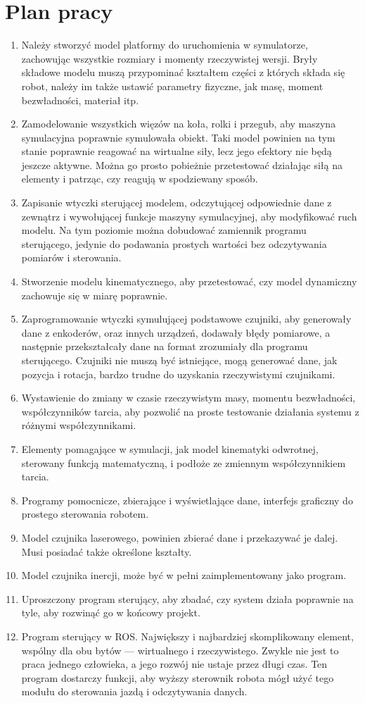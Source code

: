 \section{Plan pracy}
	\begin{enumerate}
	\item Należy stworzyć model platformy do uruchomienia w symulatorze, zachowując wszystkie rozmiary i momenty rzeczywistej wersji.
	Bryły składowe modelu muszą przypominać kształtem części z których składa się robot, należy im także ustawić parametry fizyczne, jak masę, moment bezwładności, materiał itp.
	\item Zamodelowanie wszystkich więzów na koła, rolki i przegub, aby maszyna symulacyjna poprawnie symulowała obiekt.
	Taki model powinien na tym stanie poprawnie reagować na wirtualne siły, lecz jego efektory nie będą jeszcze aktywne.
	Można go prosto pobieżnie przetestować działając siłą na elementy i patrząc, czy reagują w spodziewany sposób.
	\item Zapisanie wtyczki sterującej modelem, odczytującej odpowiednie dane z zewnątrz i wywołującej funkcje maszyny symulacyjnej, aby modyfikować ruch modelu.
	Na tym poziomie można dobudować zamiennik programu sterującego, jedynie do podawania prostych wartości bez odczytywania pomiarów i sterowania.
	\item Stworzenie modelu kinematycznego, aby przetestować, czy model dynamiczny zachowuje się w miarę poprawnie.
	\item Zaprogramowanie wtyczki symulującej podstawowe czujniki, aby generowały dane z enkoderów, oraz innych urządzeń, dodawały błędy pomiarowe, a następnie przekształcały dane na format zrozumiały dla programu sterującego.
	Czujniki nie muszą być istniejące, mogą generować dane, jak pozycja i rotacja, bardzo trudne do uzyskania rzeczywistymi czujnikami.
	\item Wystawienie do zmiany w czasie rzeczywistym masy, momentu bezwładności, współczynników tarcia, aby pozwolić na proste testowanie działania systemu z różnymi współczynnikami.
	\item Elementy pomagające w symulacji, jak model kinematyki odwrotnej, sterowany funkcją matematyczną, i podłoże ze zmiennym współczynnikiem tarcia.
	\item Programy pomocnicze, zbierające i wyświetlające dane, interfejs graficzny do prostego sterowania robotem.
	\item Model czujnika laserowego, powinien zbierać dane i przekazywać je dalej. Musi posiadać także określone kształty.
	\item Model czujnika inercji, może być w pełni zaimplementowany jako program.
	\item Uproszczony program sterujący, aby zbadać, czy system działa poprawnie na tyle, aby rozwinąć go w końcowy projekt.
	\item Program sterujący w ROS. Największy i najbardziej skomplikowany element, wspólny dla obu bytów --- wirtualnego i rzeczywistego.
	Zwykle nie jest to praca jednego człowieka, a jego rozwój nie ustaje przez długi czas.
	Ten program dostarczy funkcji, aby wyższy sterownik robota mógł użyć tego modułu do sterowania jazdą i odczytywania danych.
	\end{enumerate}
	
